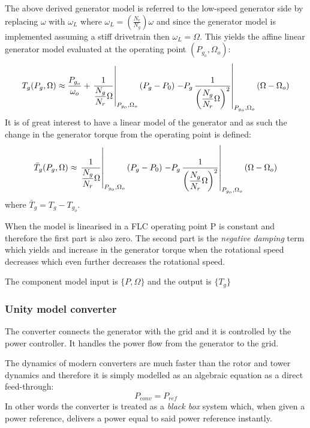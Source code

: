 The above derived generator model is referred to the low-speed generator side by replacing $ \omega $ with $ \omega_L $ where $ \omega_L = \left (\frac{N_r}{N_g} \right ) \omega $ and since the generator model is implemented assuming a stiff drivetrain then $ \omega_L = \Omega $. This yields the affine linear generator model evaluated at the operating point $ (P_{g_o}, \Omega_o) $:
\begin{equation}
	T_g(P_g, \Omega) \approx \dfrac{P_{g_o}}{\omega_o} + \left. \dfrac{1}{\dfrac{N_g}{N_r} \Omega} \right |_{P_{g_o},\Omega_o} (P_g - P_0) \\ 
	\left. - P_g \, \dfrac{1}{\left( \dfrac{N_g}{N_r} \Omega \right)^2} \right |_{P_{g_o},\Omega_o} (\Omega - \Omega_o)
\end{equation}
It is of great interest to have a linear model of the generator and as such the change in the generator torque from the operating point is defined:
\begin{equation}
	\bar T_g(P_g, \Omega) \approx \left. \dfrac{1}{\dfrac{N_g}{N_r} \Omega} \right |_{P_{g_o},\Omega_o} (P_g - P_0) \\ 
	\left. - P_g \, \dfrac{1}{\left( \dfrac{N_g}{N_r} \Omega \right)^2} \right |_{P_{g_o},\Omega_o} (\Omega - \Omega_o)
\end{equation}
where $ \bar T_g = T_g - T_{g_o} $.

When the model is linearised in a FLC operating point P is constant and therefore the first part is also zero. The second part is the \textit{negative damping} term which yields and increase in the generator torque when the rotational speed decreases which even further decreases the rotational speed.

The component model input is $ \{P, \Omega\} $ and the output is $ \{T_g\} $


\subsubsection{Unity model converter} \label{sec:comp_conv_unity}
The converter connects the generator with the grid and it is controlled by the power controller. It handles the power flow from the generator to the grid.

The dynamics of modern converters are much faster than the rotor and tower dynamics and therefore it is simply modelled as an algebraic equation as a direct feed-through:
\begin{equation}\label{eq:comp_convdft}
	P_{conv} = P_{ref}
\end{equation}
In other words the converter is treated as a \textit{black box} system which, when given a power reference, delivers a power equal to said power reference instantly.

